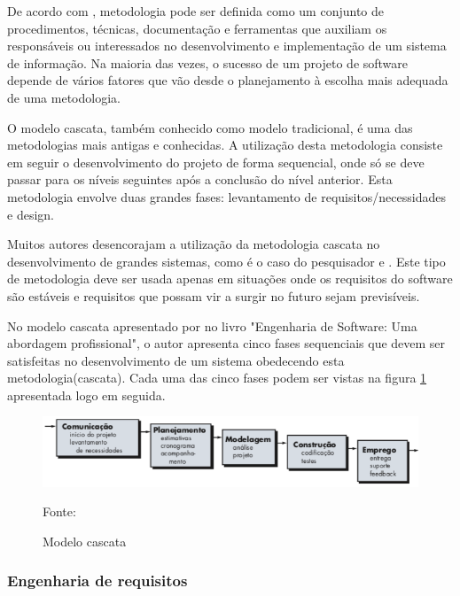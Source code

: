 De acordo com , metodologia pode ser definida como um conjunto de procedimentos, técnicas, documentação e ferramentas que 
auxiliam os responsáveis ou interessados no desenvolvimento e implementação de um sistema de informação. Na maioria das vezes, o sucesso
de um projeto de software depende de vários fatores que vão desde o planejamento à escolha mais adequada de uma metodologia.

O modelo cascata, também conhecido como modelo tradicional, é uma das metodologias mais antigas e conhecidas. A utilização desta 
metodologia consiste em seguir o desenvolvimento do projeto de forma sequencial, onde só se deve passar para os níveis seguintes após
a conclusão do nível anterior. Esta metodologia envolve duas grandes fases: levantamento de requisitos/necessidades e design. \cite{semedo2012ganhos}

Muitos autores desencorajam a utilização da metodologia cascata no desenvolvimento de grandes sistemas, como é o caso do pesquisador
  e . Este tipo de metodologia deve ser usada apenas em situações onde os requisitos do software são estáveis e requisitos
que possam vir a surgir no futuro sejam previsíveis. \cite{semedo2012ganhos}


No modelo cascata apresentado por  no livro "Engenharia de Software: Uma abordagem profissional", o autor
apresenta cinco fases sequenciais que devem ser satisfeitas no desenvolvimento de um sistema obedecendo esta metodologia(cascata). 
Cada uma das cinco fases podem ser vistas na figura \ref{cascata} apresentada logo em seguida.

\begin{figure}[h]
	\centering
	\includegraphics[keepaspectratio=true,scale=0.6]{figuras/cascata.png}
	\caption{Modelo cascata}
	Fonte: \cite{pressman}
	\label{cascata}
\end{figure}


\subsubsection{Engenharia de requisitos}

